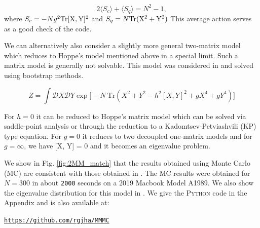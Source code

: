 \documentclass[11pt]{article}
\newcommand{\PY}{\textsc{Python }}
\begin{document}
\begin{equation}
	2 \langle S_{c} \rangle + \langle S_{q}  \rangle = N^2 - 1, 
\end{equation}
where $ S_{c} = -Ng^2 \rm{Tr}[X,Y]^2$  and 
$ S_{q} = N \rm{Tr} (X^2 + Y^2) $
This average action serves as a good check of the code. 

We can alternatively also consider a slightly more general two-matrix model which reduces to 
Hoppe's model mentioned above in a special limit. Such a matrix model is generally not solvable. 
This model was considered in \cite{Kazakov:2021lel} and solved using bootstrap methods. 

\begin{equation}
\label{eq:GHM1} 
Z = \int \mathcal{D}X \mathcal{D}Y \exp \Big[-N ~ \mbox{Tr} (X^2 + Y^2 - h^2 [X,Y]^2 + gX^4 + gY^4) \Big]	
\end{equation} 

For $h = 0$ it can be reduced to Hoppe's matrix model which can be solved via saddle-point analysis or through the reduction to a Kadomtsev-Petviashvili (KP) type equation. For $g = 0$ it reduces to two decoupled one-matrix models and for $g = \infty$, 
we have [X, Y] = 0 and it becomes an eigenvalue problem. 

We show in Fig. \ref{fig:2MM_match} that the results obtained using Monte Carlo (MC) are 
consistent with those obtained in \cite{Kazakov:2021lel}. The MC 
results were obtained for $N = 300$ in about \texttt{2000} seconds on a 2019 Macbook Model A1989. 
We also show the eigenvalue distribution for this model in \label{fig:2MM_match1}. 
We give the \PY code in the Appendix and is also
available at: 
\begin{center} \texttt{\href{https://github.com/rgjha/MMMC}{https://github.com/rgjha/MMMC}} \end{center}
\end{document}
